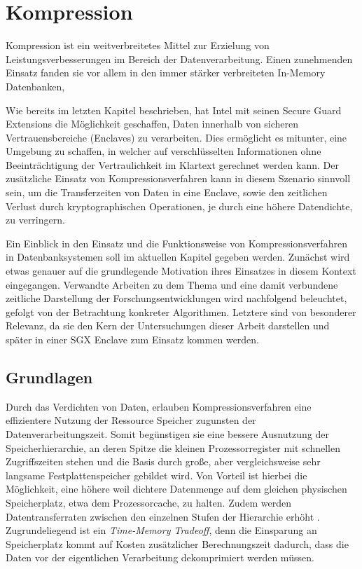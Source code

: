 
\chapter{Kompression}

Kompression ist ein weitverbreitetes Mittel zur Erzielung von Leistungsverbesserungen im Bereich der Datenverarbeitung. Einen zunehmenden Einsatz fanden sie vor allem in den immer stärker verbreiteten In-Memory Datenbanken, %

Wie bereits im letzten Kapitel beschrieben, hat Intel mit seinen Secure Guard Extensions die Möglichkeit geschaffen, Daten innerhalb von sicheren Vertrauensbereiche (Enclaves) zu verarbeiten. Dies ermöglicht es mitunter, eine Umgebung zu schaffen, in welcher auf verschlüsselten Informationen ohne Beeinträchtigung der Vertraulichkeit im Klartext gerechnet werden kann. Der zusätzliche Einsatz von Kompressionsverfahren kann in diesem Szenario sinnvoll sein, um die Transferzeiten von Daten in eine Enclave, sowie den zeitlichen Verlust durch kryptographischen Operationen, je durch eine höhere Datendichte, zu verringern.

Ein Einblick in den Einsatz und die Funktionsweise von Kompressionsverfahren in Datenbanksystemen soll im aktuellen Kapitel gegeben werden. Zunächst wird etwas genauer auf die grundlegende Motivation ihres Einsatzes in diesem Kontext eingegangen. Verwandte Arbeiten zu dem Thema und eine damit verbundene zeitliche Darstellung der Forschungsentwicklungen wird nachfolgend beleuchtet, gefolgt von der Betrachtung konkreter Algorithmen. Letztere sind von besonderer Relevanz, da sie den Kern der Untersuchungen dieser Arbeit darstellen und später in einer SGX Enclave zum Einsatz kommen werden.

\section{Grundlagen} %

Durch das Verdichten von Daten, erlauben Kompressionsverfahren eine effizientere Nutzung der Ressource Speicher zugunsten der Datenverarbeitungszeit. Somit begünstigen sie eine bessere Ausnutzung der Speicherhierarchie, an deren Spitze die kleinen Prozessorregister mit schnellen Zugriffszeiten stehen und die Basis durch große, aber vergleichsweise sehr langsame Festplattenspeicher gebildet wird. Von Vorteil ist hierbei die Möglichkeit, eine höhere weil dichtere Datenmenge auf dem gleichen physischen Speicherplatz, etwa dem Prozessorcache, zu halten. Zudem werden Datentransferraten zwischen den einzelnen Stufen der Hierarchie erhöht \cite{Croft2009}. Zugrundeliegend ist ein \textit{Time-Memory Tradeoff}, denn die Einsparung an Speicherplatz kommt auf Kosten zusätzlicher Berechnungszeit dadurch, dass die Daten vor der eigentlichen Verarbeitung dekomprimiert werden müssen.

